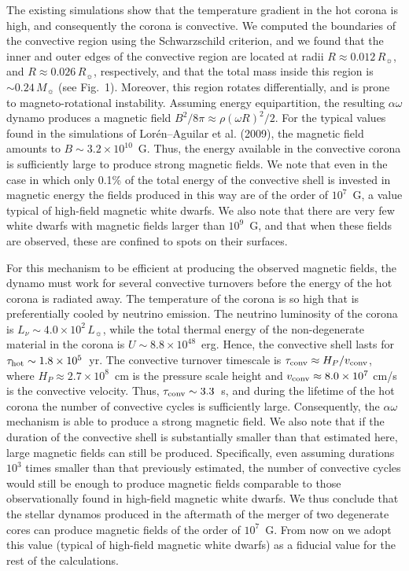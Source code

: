\documentclass[]{emulateapj}
\begin{document}
The existing simulations show that the temperature gradient in the hot
corona is high, and consequently the corona is convective. We computed
the  boundaries  of  the  convective region  using  the  Schwarzschild
criterion,  and  we  found that  the  inner  and  outer edges  of  the
convective region  are located  at radii $R\approx  0.012\, R_{\sun}$,
and  $R \approx 0.026\,  R_{\sun}$, respectively,  and that  the total
mass   inside  this   region   is  $\sim   0.24   \,  M_{\sun}$   (see
Fig.~1). Moreover, this region rotates differentially, and is prone to
magneto-rotational  instability.  Assuming  energy  equipartition, the
resulting   $\alpha\omega$   dynamo    produces   a   magnetic   field
$B^2/8\pi\approx \rho(\omega R)^2/2$. For  the typical values found in
the simulations of Lor\'en--Aguilar  et al. (2009), the magnetic field
amounts to $B\sim 3.2\times 10^{10}$~G.  Thus, the energy available in
the convective corona is sufficiently large to produce strong magnetic
fields. We note that even in the case in which only 0.1\% of the total
energy  of the  convective shell  is invested  in magnetic  energy the
fields produced  in this  way are  of the order  of $10^7$~G,  a value
typical of high-field magnetic white  dwarfs.  We also note that there
are very few  white dwarfs with magnetic fields  larger than $10^9$~G,
and  that  when these  fields  are  observed,  these are  confined  to
spots on their surfaces.

For this mechanism to be  efficient at producing the observed magnetic
fields, the  dynamo must work for several  convective turnovers before
the energy of the hot corona  is radiated away. The temperature of the
corona is so high that  is preferentially cooled by neutrino emission.
The neutrino  luminosity of the corona is  $L_\nu\sim 4.0\times 10^2\,
L_{\sun}$,  while  the  total  thermal energy  of  the  non-degenerate
material in  the corona is $U\sim 8.8\times  10^{48}$~erg.  Hence, the
convective  shell lasts  for $\tau_{\rm  hot}\sim  1.8\times 10^5$~yr.
The   convective  turnover   timescale   is  $\tau_{\rm   conv}\approx
H_P/v_{\rm  conv}$,  where   $H_P\approx  2.7\times  10^8$~cm  is  the
pressure scale height and $v_{\rm conv}\approx 8.0\times 10^7$ cm/s is
the  convective  velocity.   Thus,  $\tau_{\rm conv}\sim  3.3$~s,  and
during the lifetime of the  hot corona the number of convective cycles
is sufficiently  large. Consequently, the  $\alpha\omega$ mechanism is
able to  produce a strong  magnetic field.  We  also note that  if the
duration of  the convective shell  is substantially smaller  than that
estimated  here,   large  magnetic  fields  can   still  be  produced.
Specifically, even  assuming durations $10^3$ times  smaller than that
previously estimated,  the number of convective cycles  would still be
enough to produce magnetic  fields comparable to those observationally
found in high-field magnetic white  dwarfs.  We thus conclude that the
stellar  dynamos  produced in  the  aftermath  of  the merger  of  two
degenerate cores can produce magnetic fields of the order of $10^7$~G.
From now on we adopt  this value (typical of high-field magnetic white
dwarfs) as a fiducial value for the rest of the calculations.
\end{document}
